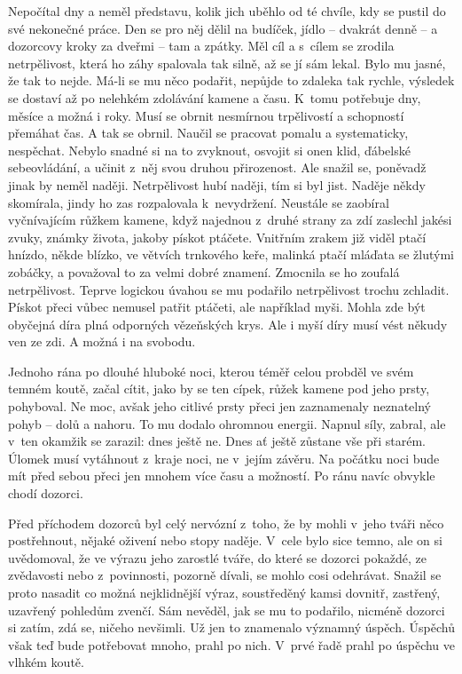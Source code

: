 Nepočítal dny a neměl představu, kolik jich uběhlo od té chvíle, kdy se pustil do své nekonečné práce. Den se pro něj dělil na budíček, jídlo -- dvakrát denně -- a dozorcovy kroky za dveřmi -- tam a zpátky. Měl cíl a s cílem se zrodila netrpělivost, která ho záhy spalovala tak silně, až se jí sám lekal. Bylo mu jasné, že tak to nejde. Má-li se mu něco podařit, nepůjde to zdaleka tak rychle, výsledek se dostaví až po nelehkém zdolávání kamene a času. K tomu potřebuje dny, měsíce a možná i roky. Musí se obrnit nesmírnou trpělivostí a schopností přemáhat čas. A tak se obrnil. Naučil se pracovat pomalu a systematicky, nespěchat. Nebylo snadné si na to zvyknout, osvojit si onen klid, ďábelské sebeovládání, a učinit z něj svou druhou přirozenost. Ale snažil se, poněvadž jinak by neměl naději. Netrpělivost hubí naději, tím si byl jist. Naděje někdy skomírala, jindy ho zas rozpalovala k nevydržení. Neustále se zaobíral vyčnívajícím růžkem kamene, když najednou z druhé strany za zdí zaslechl jakési zvuky, známky života, jakoby pískot ptáčete. Vnitřním zrakem již viděl ptačí hnízdo, někde blízko, ve větvích trnkového keře, malinká ptačí mláďata se žlutými zobáčky, a považoval to za velmi dobré znamení. Zmocnila se ho zoufalá netrpělivost. Teprve logickou úvahou se mu podařilo netrpělivost trochu zchladit. Pískot přeci vůbec nemusel patřit ptáčeti, ale například myši. Mohla zde být obyčejná díra plná odporných vězeňských krys. Ale i myší díry musí vést někudy ven ze zdi. A možná i na svobodu.

Jednoho rána po dlouhé hluboké noci, kterou téměř celou probděl ve svém temném koutě, začal cítit, jako by se ten cípek, růžek kamene pod jeho prsty, pohyboval. Ne moc, avšak jeho citlivé prsty přeci jen zaznamenaly neznatelný pohyb -- dolů a nahoru. To mu dodalo ohromnou energii. Napnul síly, zabral, ale v ten okamžik se zarazil: dnes ještě ne. Dnes ať ještě zůstane vše při starém. Úlomek musí vytáhnout z kraje noci, ne v jejím závěru. Na počátku noci bude mít před sebou přeci jen mnohem více času a možností. Po ránu navíc obvykle chodí dozorci.

Před příchodem dozorců byl celý nervózní z toho, že by mohli v jeho tváři něco postřehnout, nějaké oživení nebo stopy naděje. V cele bylo sice temno, ale on si uvědomoval, že ve výrazu jeho zarostlé tváře, do které se dozorci pokaždé, ze zvědavosti nebo z povinnosti, pozorně dívali, se mohlo cosi odehrávat. Snažil se proto nasadit co možná nejklidnější výraz, soustředěný kamsi dovnitř, zastřený, uzavřený pohledům zvenčí. Sám nevěděl, jak se mu to podařilo, nicméně dozorci si zatím, zdá se, ničeho nevšimli. Už jen to znamenalo významný úspěch. Úspěchů však teď bude potřebovat mnoho, prahl po nich. V prvé řadě prahl po úspěchu ve vlhkém koutě.

